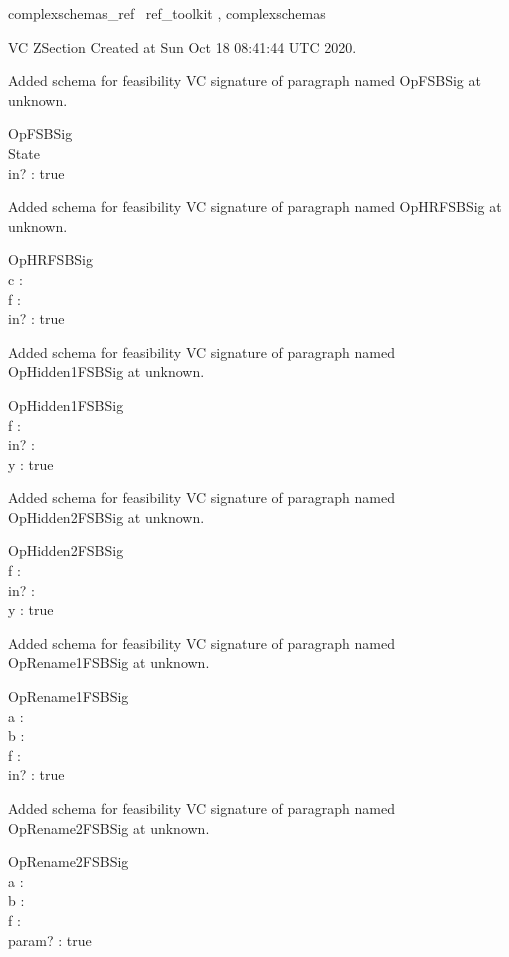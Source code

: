 \documentclass{article}
\begin{document}

\begin{zsection}	 \SECTION complexschemas\_ref \parents~ref\_toolkit , complexschemas
\end{zsection}

VC ZSection Created at Sun Oct 18 08:41:44 UTC 2020.


Added schema for feasibility VC signature of paragraph named OpFSBSig at unknown.
\begin{schema}{OpFSBSig}
\\
 State \\
 in? : \nat 
\where
 true
\end{schema}


Added schema for feasibility VC signature of paragraph named OpHRFSBSig at unknown.
\begin{schema}{OpHRFSBSig}
\\
 c : \nat \\
 f : \nat \pfun \nat \\
 in? : \nat 
\where
 true
\end{schema}


Added schema for feasibility VC signature of paragraph named OpHidden1FSBSig at unknown.
\begin{schema}{OpHidden1FSBSig}
\\
 f : \nat \pfun \nat \\
 in? : \nat \\
 y : \power \nat 
\where
 true
\end{schema}


Added schema for feasibility VC signature of paragraph named OpHidden2FSBSig at unknown.
\begin{schema}{OpHidden2FSBSig}
\\
 f : \nat \pfun \nat \\
 in? : \nat \\
 y : \power \nat 
\where
 true
\end{schema}


Added schema for feasibility VC signature of paragraph named OpRename1FSBSig at unknown.
\begin{schema}{OpRename1FSBSig}
\\
 a : \nat \\
 b : \power \nat \\
 f : \nat \pfun \nat \\
 in? : \nat 
\where
 true
\end{schema}


Added schema for feasibility VC signature of paragraph named OpRename2FSBSig at unknown.
\begin{schema}{OpRename2FSBSig}
\\
 a : \nat \\
 b : \power \nat \\
 f : \nat \pfun \nat \\
 param? : \nat 
\where
 true
\end{schema}
\end{document}
